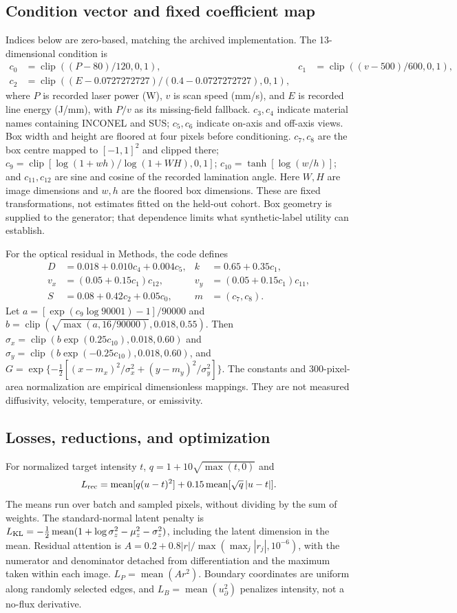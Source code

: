 \subsection{Condition vector and fixed coefficient map}
Indices below are zero-based, matching the archived implementation. The 13-dimensional condition is
\begin{align*}
c_0&=\operatorname{clip}((P-80)/120,0,1), &c_1&=\operatorname{clip}((v-500)/600,0,1),\\
c_2&=\operatorname{clip}((E-0.0727272727)/(0.4-0.0727272727),0,1),
\end{align*}
where $P$ is recorded laser power (W), $v$ is scan speed (mm/s), and $E$ is recorded line energy (J/mm), with $P/v$ as its missing-field fallback. $c_3,c_4$ indicate material names containing INCONEL and SUS; $c_5,c_6$ indicate on-axis and off-axis views. Box width and height are floored at four pixels before conditioning. $c_7,c_8$ are the box centre mapped to $[-1,1]^2$ and clipped there; $c_9=\operatorname{clip}[\log(1+wh)/\log(1+WH),0,1]$; $c_{10}=\tanh[\log(w/h)]$; and $c_{11},c_{12}$ are sine and cosine of the recorded lamination angle. Here $W,H$ are image dimensions and $w,h$ are the floored box dimensions. These are fixed transformations, not estimates fitted on the held-out cohort. Box geometry is supplied to the generator; that dependence limits what synthetic-label utility can establish.

For the optical residual in Methods, the code defines
\begin{align*}
D&=0.018+0.010c_4+0.004c_5, &k&=0.65+0.35c_1,\\
v_x&=(0.05+0.15c_1)c_{12}, &v_y&=(0.05+0.15c_1)c_{11},\\
S&=0.08+0.42c_2+0.05c_0, &m&=(c_7,c_8).
\end{align*}
Let $a=[\exp(c_9\log90001)-1]/90000$ and
$b=\operatorname{clip}(\sqrt{\max(a,16/90000)},0.018,0.55)$.
Then $\sigma_x=\operatorname{clip}(b\exp(0.25c_{10}),0.018,0.60)$ and
$\sigma_y=\operatorname{clip}(b\exp(-0.25c_{10}),0.018,0.60)$, and
$G=\exp\{-\tfrac12[(x-m_x)^2/\sigma_x^2+(y-m_y)^2/\sigma_y^2]\}$.
The constants and 300-pixel-area normalization are empirical dimensionless mappings. They are not measured diffusivity, velocity, temperature, or emissivity.

\subsection{Losses, reductions, and optimization}
For normalized target intensity $t$, $q=1+10\sqrt{\max(t,0)}$ and
\[
L_{\rm rec}=\operatorname{mean}[q(u-t)^2]+0.15\operatorname{mean}[\sqrt q\,|u-t|].
\]
The means run over batch and sampled pixels, without dividing by the sum of weights. The standard-normal latent penalty is
$L_{\rm KL}=-\tfrac12\operatorname{mean}(1+\log\sigma_z^2-\mu_z^2-\sigma_z^2)$,
including the latent dimension in the mean. Residual attention is
$A=0.2+0.8|r|/\max(\max_j|r_j|,10^{-6})$, with the numerator and denominator detached from differentiation and the maximum taken within each image. $L_P=\operatorname{mean}(Ar^2)$. Boundary coordinates are uniform along randomly selected edges, and $L_B=\operatorname{mean}(u_{\partial}^2)$ penalizes intensity, not a no-flux derivative.

